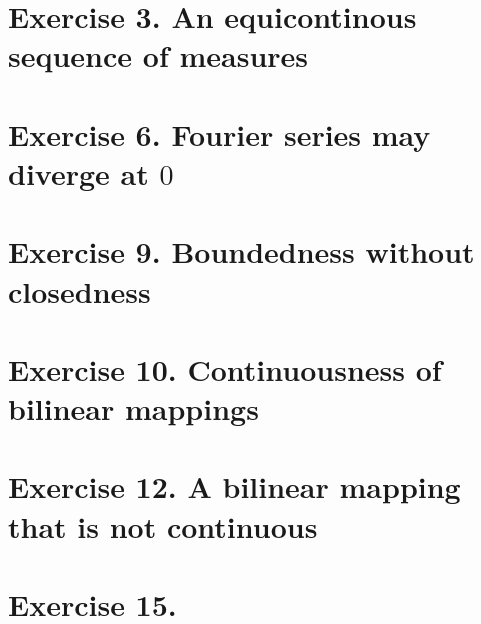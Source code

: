 \section{Exercise 3. An equicontinous sequence of measures}

\section{Exercise 6. Fourier series may diverge at $0$}

\section{Exercise 9. Boundedness without closedness}

\newpage
\section{Exercise 10. Continuousness of bilinear mappings}

\newpage
\section{Exercise 12. A bilinear mapping that is not continuous}

\newpage
\section{Exercise 15.}
